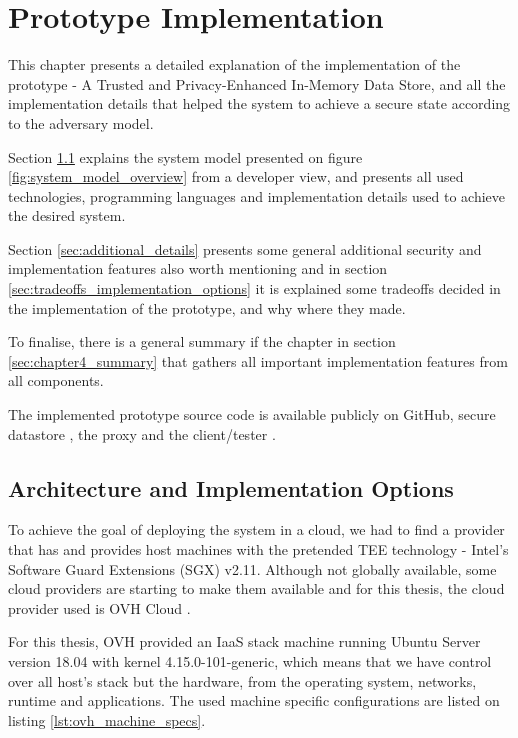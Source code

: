
\chapter{Prototype Implementation}
\label{cha:elaboration_plan}

This chapter presents a detailed explanation of the implementation of the prototype - A Trusted and Privacy-Enhanced In-Memory Data Store, and all the implementation details that helped the system to achieve a secure state according to the adversary model.

Section \ref{sec:architecture_implementation_options} explains the system model presented on figure \ref{fig:system_model_overview} from a developer view, and presents all used technologies, programming languages and implementation details used to achieve the desired system.

Section \ref{sec:additional_details} presents some general additional security and implementation features also worth mentioning and in section \ref{sec:tradeoffs_implementation_options} it is explained some tradeoffs decided in the implementation of the prototype, and why where they made. 

To finalise, there is a general summary if the chapter in section \ref{sec:chapter4_summary} that gathers all important implementation features from all components.

The implemented prototype source code is available publicly on GitHub, secure datastore \cite{thesis-repository:container}, the proxy \cite{thesis-repository:proxy} and the client/tester \cite{thesis-repository:client}.

\section{Architecture and Implementation Options}
\label{sec:architecture_implementation_options}

To achieve the goal of deploying the system in a cloud, we had to find a provider that has and provides host machines with the pretended \gls{TEE} technology - Intel's Software Guard Extensions (\gls{SGX}) v2.11. Although not globally available, some cloud providers are starting to make them available and for this thesis, the cloud provider used is OVH Cloud \cite{ovhcloud:1}. 

For this thesis, OVH provided an IaaS stack machine running Ubuntu Server version 18.04 with kernel 4.15.0-101-generic, which means that we have control over all host's stack but the hardware, from the operating system, networks, runtime and applications. The used machine specific configurations are listed on listing \ref{lst:ovh_machine_specs}.

